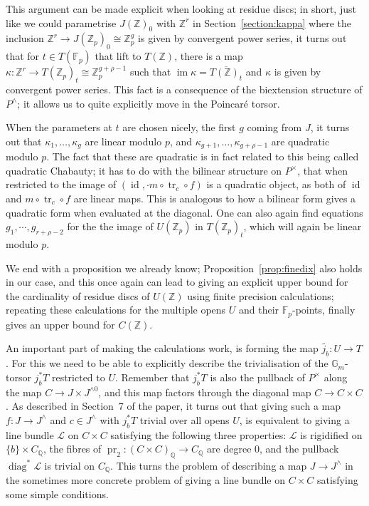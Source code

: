 \documentclass[12pt]{article}
\newcommand{\Z}{\mathbb{Z}}
\renewcommand{\G}{\mathbb{G}}
\newcommand{\Q}{\mathbb{Q}}
\newcommand{\Lcal}{\mathcal{L}}
\newcommand{\F}{\mathbb{F}}
\DeclareMathOperator{\im}{im}
\DeclareMathOperator{\id}{id}
\DeclareMathOperator{\tr}{tr}
\DeclareMathOperator{\pr}{pr}
\DeclareMathOperator{\diag}{diag}
\theoremstyle{plain}
\theoremstyle{definition}
\theoremstyle{remark}
\begin{document}
This argument can be made explicit when looking at residue discs; in short, just like we could parametrise $J(\Z)_0$ with $\Z^r$ in Section~\ref{section:kappa} where the inclusion $\Z^r \to J(\Z_p)_0 \cong \Z_p^{g}$ is given by convergent power series, it turns out that for $t \in T(\F_p)$ that lift to $T(\Z)$, there is a map $\kappa: \Z^r \to T(\Z_p)_t \cong \Z_p^{g+\rho-1}$ such that $\im \kappa = \overline{T(\Z)_t}$ and $\kappa$ is given by convergent power series. This fact is a consequence of the biextension structure of $P^\wedge$; it allows us to quite explicitly move in the Poincar\'e torsor.

When the parameters at $t$ are chosen nicely, the first $g$ coming from $J$, it turns out that $\kappa_1,\dots,\kappa_g$ are linear modulo $p$, and $\kappa_{g+1},\dots,\kappa_{g+\rho-1}$ are quadratic modulo $p$. The fact that these are quadratic is in fact related to this being called quadratic Chabauty; it has to do with the bilinear structure on $P^\times$, that when restricted to the image of $(\id,\cdot m \circ\tr_c \circ f)$ is a quadratic object, as both of $\id$ and $m \circ\tr_c \circ f$ are linear maps. This is analogous to how a bilinear form gives a quadratic form when evaluated at the diagonal. One can also again find equations $g_1,\cdots,g_{r+\rho-2}$ for the the image of $U(\Z_p)$ in $T(\Z_p)_t$, which will again be linear modulo $p$.

We end with a proposition we already know; Proposition~\ref{prop:finedix} also holds in our case, and this once again can lead to giving an explicit upper bound for the cardinality of residue discs of $U(\Z)$ using finite precision calculations; repeating these calculations for the multiple opens $U$ and their $\F_p$-points, finally gives an upper bound for $C(\Z)$.

An important part of making the calculations work, is forming the map $\widetilde{j_b}: U \to T$. For this we need to be able to explicitly describe the trivialisation of the $\G_m$-torsor $j_b^* T$ restricted to $U$. Remember that $j_b^* T$ is also the pullback of $P^\times$ along the map $C \to J \times J^{\wedge 0}$, and this map factors through the diagonal map $C \to C\times C$. As described in Section~7 of the paper, it turns out that giving such a map $f: J \to J^{\wedge}$ and $c \in J^\wedge$ with $j_b^* T$ trivial over all opens $U$, is equivalent to giving a line bundle $\Lcal$ on $C \times C$ satisfying the following three properties: $\Lcal$ is rigidified on $\{b\} \times C_\Q$, the fibres of $\pr_2: (C \times C)_\Q \to C_\Q$ are degree $0$, and the pullback $\diag^* \Lcal$ is trivial on $C_\Q$. This turns the problem of describing a map $J \to J^\wedge$ in the sometimes more concrete problem of giving a line bundle on $C \times C$ satisfying some simple conditions.
\end{document}
